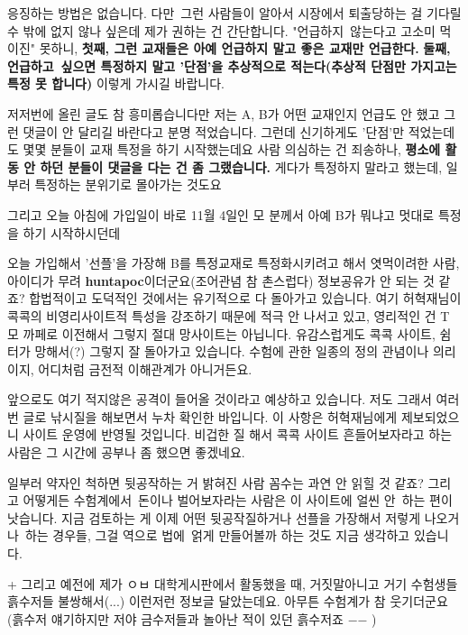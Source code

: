 응징하는 방법은 없습니다. 다만 그런 사람들이 알아서 시장에서 퇴출당하는 걸 기다릴 수 밖에 없지 않나 싶은데
제가 권하는 건 간단합니다. "언급하지 않는다고 고소미 먹이진" 못하니,
\textbf{첫째, 그런 교재들은 아예 언급하지 말고 좋은 교재만 언급한다.}
\textbf{둘째, 언급하고 싶으면 특정하지 말고 '단점'을 추상적으로 적는다(추상적 단점만 가지고는 특정 못 합니다)}
이렇게 가시길 바랍니다.
\vspace{5mm}

저저번에 올린 글도 참 흥미롭습니다만 저는 A, B가 어떤 교재인지 언급도 안 했고 그런 댓글이 안 달리길 바란다고 분명 적었습니다.
그런데 신기하게도 '단점'만 적었는데도 몇몇 분들이 교재 특정을 하기 시작했는데요
사람 의심하는 건 죄송하나, \textbf{평소에 활동 안 하던 분들이 댓글을 다는 건 좀 그랬습니다.}
게다가 특정하지 말라고 했는데, 일부러 특정하는 분위기로 몰아가는 것도요
\vspace{5mm}

그리고 오늘 아침에 가입일이 바로 11월 4일인 모 분께서 아예 B가 뭐냐고 멋대로 특정을 하기 시작하시던데
\vspace{5mm}

오늘 가입해서 '선플'을 가장해 B를 특정교재로 특정화시키려고 해서 엿먹이려한 사람, 아이디가 무려 \textbf{huntapoc}이더군요(조어관념 참 촌스럽다)
정보공유가 안 되는 것 같죠? 합법적이고 도덕적인 것에서는 유기적으로 다 돌아가고 있습니다.
여기 허혁재님이 콕콕의 비영리사이트적 특성을 강조하기 때문에 적극 안 나서고 있고, 영리적인 건 T 모 까페로 이전해서 그렇지
절대 망사이트는 아닙니다.
유감스럽게도 콕콕 사이트, 쉼터가 망해서(?) 그렇지 잘 돌아가고 있습니다.
수험에 관한 일종의 정의 관념이나 의리이지, 어디처럼 금전적 이해관계가 아니거든요.
\vspace{5mm}

앞으로도 여기 적지않은 공격이 들어올 것이라고 예상하고 있습니다. 저도 그래서 여러번 글로 낚시질을 해보면서 누차 확인한 바입니다.
이 사항은 허혁재님에게 제보되었으니 사이트 운영에 반영될 것입니다.
비겁한 질 해서 콕콕 사이트 흔들어보자라고 하는 사람은 그 시간에 공부나 좀 했으면 좋겠네요.
\vspace{5mm}

일부러 약자인 척하면 뒷공작하는 거 밝혀진 사람 꼼수는 과연 안 읽힐 것 같죠?
그리고 어떻게든 수험계에서 돈이나 벌어보자라는 사람은 이 사이트에 얼씬 안 하는 편이 낫습니다.
지금 검토하는 게 이제 어떤 뒷공작질하거나 선플을 가장해서 저렇게 나오거나 하는 경우들,
그걸 역으로 법에 얽게 만들어볼까 하는 것도 지금 생각하고 있습니다.
\vspace{5mm}

+ 그리고 예전에 제가 ㅇㅂ 대학게시판에서 활동했을 때, 거짓말아니고 거기 수험생들 흙수저들 불쌍해서(...) 이런저런 정보글 달았는데요.
아무튼 수험계가 참 웃기더군요(흙수저 얘기하지만 저야 금수저들과 놀아난 적이 있던 흙수저죠 $-$$-$ )
\vspace{5mm}

